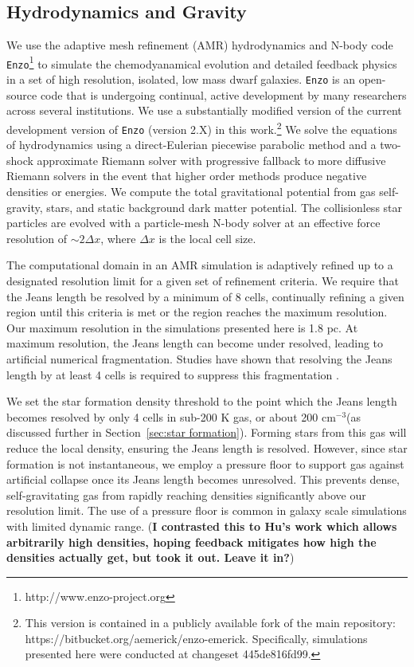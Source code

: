 \documentclass[twocolumn]{aastex61}
\newcommand{\ccunit}{cm$^{-3}$}
\begin{document}
\subsection{Hydrodynamics and Gravity}
\label{sec:hydro}

We use the adaptive mesh refinement (AMR) hydrodynamics and N-body code \texttt{Enzo}\footnote{http://www.enzo-project.org} to simulate the chemodyanamical evolution and detailed feedback physics in a set of high resolution, isolated, low mass dwarf galaxies. \texttt{Enzo} is an open-source code that is undergoing continual, active development by many researchers across several institutions. We use a substantially modified version of the current development version of \texttt{Enzo} (version 2.X) in this work.\footnote{This version is contained in a publicly available fork of the main repository: https://bitbucket.org/aemerick/enzo-emerick. Specifically, simulations presented here were conducted at changeset 445de816fd99.} We solve the equations of hydrodynamics using a direct-Eulerian piecewise parabolic method \citep{ColellaWoodward1984, Bryan1995} and a two-shock approximate Riemann solver with progressive fallback to more diffusive Riemann solvers in the event that higher order methods produce negative densities or energies. We compute the total gravitational potential from gas self-gravity, stars, and static background dark matter potential. The collisionless star particles are evolved with a particle-mesh N-body solver at an effective force resolution of $\sim 2 \Delta x$, where $\Delta x$ is the local cell size. 

The computational domain in an AMR simulation is adaptively refined up to a designated resolution limit for a given set of refinement criteria. We require that the Jeans length be resolved by a minimum of 8 cells, continually refining a given region until this criteria is met or the region reaches the maximum resolution. Our maximum resolution in the simulations presented here is 1.8 pc. At maximum resolution, the Jeans length can become under resolved, leading to artificial numerical fragmentation. Studies have shown that resolving the Jeans length by at least 4 cells is required to suppress this fragmentation \citep{Truelove1997}.

We set the star formation density threshold to the point which the Jeans length becomes resolved by only 4 cells in sub-200 K gas, or about 200 \ccunit (as discussed further in Section~\ref{sec:star formation}). Forming stars from this gas will reduce the local density, ensuring the Jeans length is resolved. However, since star formation is not instantaneous, we employ a pressure floor to support gas against artificial collapse once its Jeans length becomes unresolved. This prevents dense, self-gravitating gas from rapidly reaching densities significantly above our resolution limit. The use of a pressure floor is common in galaxy scale simulations with limited dynamic range. (\textbf{I contrasted this to Hu's work which allows arbitrarily high densities, hoping feedback mitigates how high the densities actually get, but took it out. Leave it in?})
\end{document}
